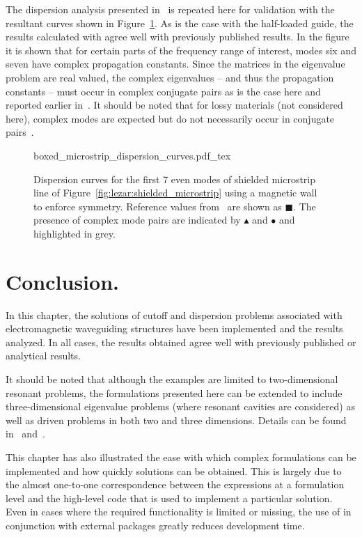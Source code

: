 The dispersion analysis presented in~\citet{PelosiCoccioliSelleri1998}
is repeated here for validation with the resultant curves shown in
Figure~\ref{fig:lezar:shielded_microstrip_dispersion_curves}. As is
the case with the half-loaded guide, the results calculated
with \fenics{} agree well with previously published results. In the
figure it is shown that for certain parts of the frequency range of
interest, modes six and seven have complex propagation
constants. Since the matrices in the eigenvalue problem are real
valued, the complex eigenvalues -- and thus the propagation constants
-- must occur in complex conjugate pairs as is the case here and
reported earlier in~\citet{HuangItoh1988}. It should be noted that for
lossy materials (not considered here), complex modes are expected but
do not necessarily occur in conjugate
pairs~\citep{PelosiCoccioliSelleri1998}.
\begin{figure}[h]
 \centering
  \def\svgwidth{\largefig}
    {boxed_microstrip_dispersion_curves.pdf_tex}
 \caption{Dispersion curves for the first 7 even modes of shielded microstrip line of Figure~\ref{fig:lezar:shielded_microstrip} using a magnetic wall to enforce symmetry. Reference values from~\citet{PelosiCoccioliSelleri1998} are shown as $\blacksquare$. The presence of complex mode pairs are indicated by $\blacktriangle$ and $\bullet$ and highlighted in grey.}
 \label{fig:lezar:shielded_microstrip_dispersion_curves}
\end{figure}
\label{lezar:sec:shielded_microstrip|)}

\section{Conclusion.}

In this chapter, the solutions of cutoff and dispersion problems
associated with electromagnetic waveguiding structures have been
implemented and the results analyzed. In all cases, the results
obtained agree well with previously published or analytical results.

It should be noted that although the examples are limited to
two-dimensional resonant problems, the formulations presented here can
be extended to include three-dimensional eigenvalue problems (where
resonant cavities are considered) as well as driven problems in both
two and three dimensions. Details can be found in~\citet{Jin2002}
and~\citet{PelosiCoccioliSelleri1998}.

This chapter has also illustrated the ease with which complex
formulations can be implemented and how quickly solutions can be
obtained. This is largely due to the almost one-to-one correspondence
between the expressions at a formulation level and the
high-level \fenics{} code that is used to implement a particular
solution. Even in cases where the required functionality is limited or
missing, the use of \fenics{} in conjunction with external packages
greatly reduces development time.
